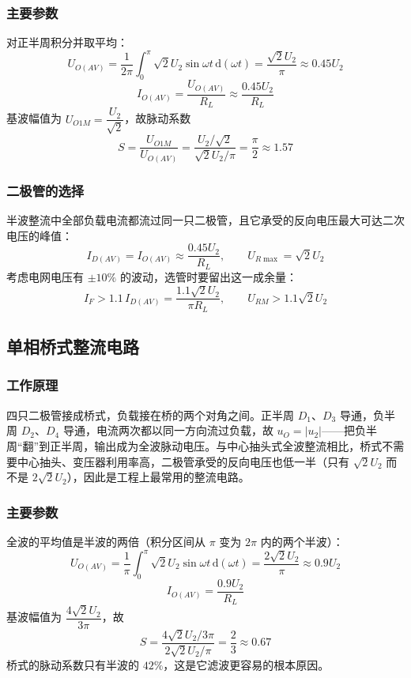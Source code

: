 \subsubsection{主要参数}
对正半周积分并取平均：
\begin{equation}
U_{O(AV)}=\frac{1}{2\pi}\int_0^{\pi}\sqrt2U_2\sin\omega t\,\mathrm{d}(\omega t)
=\frac{\sqrt2U_2}{\pi}\approx0.45U_2
\end{equation}
\begin{equation}
I_{O(AV)}=\frac{U_{O(AV)}}{R_L}\approx\frac{0.45U_2}{R_L}
\end{equation}
基波幅值为 $U_{O1M}=\dfrac{U_2}{\sqrt2}$，故脉动系数
\begin{equation}
S=\frac{U_{O1M}}{U_{O(AV)}}=\frac{U_2/\sqrt2}{\sqrt2U_2/\pi}=\frac{\pi}{2}\approx1.57
\end{equation}

\subsubsection{二极管的选择}
半波整流中全部负载电流都流过同一只二极管，且它承受的反向电压最大可达二次电压的峰值：
\begin{equation}
I_{D(AV)}=I_{O(AV)}\approx\frac{0.45U_2}{R_L},\qquad
U_{R\max}=\sqrt2U_2
\end{equation}
考虑电网电压有 $\pm10\%$ 的波动，选管时要留出这一成余量：
\begin{equation}
I_F>1.1\,I_{D(AV)}=\frac{1.1\sqrt2U_2}{\pi R_L},\qquad
U_{RM}>1.1\sqrt2U_2
\end{equation}

\subsection{单相桥式整流电路}
\subsubsection{工作原理}
四只二极管接成桥式，负载接在桥的两个对角之间。正半周 $D_1$、$D_3$ 导通，负半周 $D_2$、$D_4$ 导通，电流两次都以同一方向流过负载，故 $u_O=|u_2|$——把负半周“翻”到正半周，输出成为全波脉动电压。与中心抽头式全波整流相比，桥式不需要中心抽头、变压器利用率高，二极管承受的反向电压也低一半（只有 $\sqrt2U_2$ 而不是 $2\sqrt2U_2$），因此是工程上最常用的整流电路。

\subsubsection{主要参数}
全波的平均值是半波的两倍（积分区间从 $\pi$ 变为 $2\pi$ 内的两个半波）：
\begin{equation}
U_{O(AV)}=\frac{1}{\pi}\int_0^{\pi}\sqrt2U_2\sin\omega t\,\mathrm{d}(\omega t)
=\frac{2\sqrt2U_2}{\pi}\approx0.9U_2
\end{equation}
\begin{equation}
I_{O(AV)}=\frac{0.9U_2}{R_L}
\end{equation}
基波幅值为 $\dfrac{4\sqrt2U_2}{3\pi}$，故
\begin{equation}
S=\frac{4\sqrt2U_2/3\pi}{2\sqrt2U_2/\pi}=\frac{2}{3}\approx0.67
\end{equation}
桥式的脉动系数只有半波的 $42\%$，这是它滤波更容易的根本原因。

